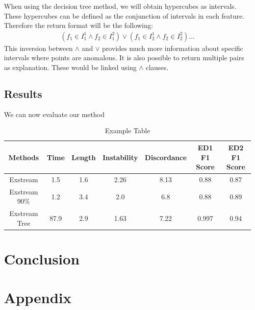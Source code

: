 \documentclass[oneside, a4paper, onecolumn, 11pt]{article}
\begin{document}
When using the decision tree method, we will obtain hypercubes as intervals. These hypercubes can be defined as the conjunction of intervals in each feature. Therefore the return format will be the following: 
\begin{align*}
  (f_1 \in I^1_1 \land f_2 \in I^2_1) \lor (f_1 \in I^1_2 \land f_2 \in I^2_2) ...
\end{align*}
This inversion between $\land$ and $\lor$ provides much more information about specific intervals where points are anomalous. It is also possible to return multiple pairs as explanation. These would be linked using $\land$ clauses.
\subsection{Results}
We can now evaluate our method
\begin{table}[h]
  \centering
  \begin{tabular}{|c|c|c|c|c|c|c|}
      \hline
      Methods & Time & Length & Instability & Discordance & ED1 F1 Score & ED2 F1 Score\\ 
      \hline
      Exstream  & 1.5  & 1.6  & 2.26  & 8.13 & 0.88 & 0.87  \\ 
      Exstream 90\%  & 1.2  & 3.4  & 2.0  & 6.8 & 0.88 & 0.89\\ 
      Exstream Tree  & 87.9  & 2.9  & 1.63 & 7.22 & 0.997 & 0.94 \\ 
      \hline
  \end{tabular}
  \caption{Example Table}
  \label{tab:example}
\end{table}


\section{Conclusion}

\newpage



\newpage
\appendix

\section{Appendix}
\label{sec:appendix}
\end{document}

